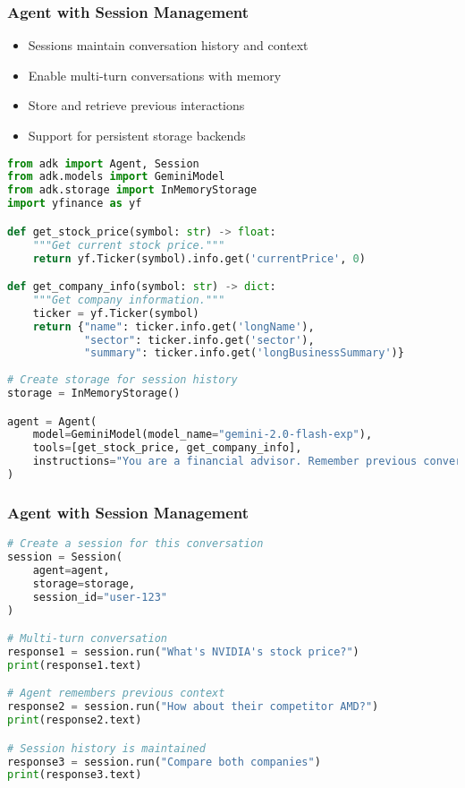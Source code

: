 \begin{frame}[fragile]\frametitle{Agent with Session Management}
      \begin{itemize}
	\item Sessions maintain conversation history and context
	\item Enable multi-turn conversations with memory
	\item Store and retrieve previous interactions
	\item Support for persistent storage backends
	  \end{itemize}
      
      \begin{lstlisting}[language=python, basicstyle=\tiny]
from adk import Agent, Session
from adk.models import GeminiModel
from adk.storage import InMemoryStorage
import yfinance as yf

def get_stock_price(symbol: str) -> float:
    """Get current stock price."""
    return yf.Ticker(symbol).info.get('currentPrice', 0)

def get_company_info(symbol: str) -> dict:
    """Get company information."""
    ticker = yf.Ticker(symbol)
    return {"name": ticker.info.get('longName'),
            "sector": ticker.info.get('sector'),
            "summary": ticker.info.get('longBusinessSummary')}
			
# Create storage for session history
storage = InMemoryStorage()

agent = Agent(
    model=GeminiModel(model_name="gemini-2.0-flash-exp"),
    tools=[get_stock_price, get_company_info],
    instructions="You are a financial advisor. Remember previous conversations."
)

      \end{lstlisting}
\end{frame}


\begin{frame}[fragile]\frametitle{Agent with Session Management}

      \begin{lstlisting}[language=python, basicstyle=\tiny]
# Create a session for this conversation
session = Session(
    agent=agent,
    storage=storage,
    session_id="user-123"
)

# Multi-turn conversation
response1 = session.run("What's NVIDIA's stock price?")
print(response1.text)

# Agent remembers previous context
response2 = session.run("How about their competitor AMD?")
print(response2.text)

# Session history is maintained
response3 = session.run("Compare both companies")
print(response3.text)
      \end{lstlisting}
\end{frame}


